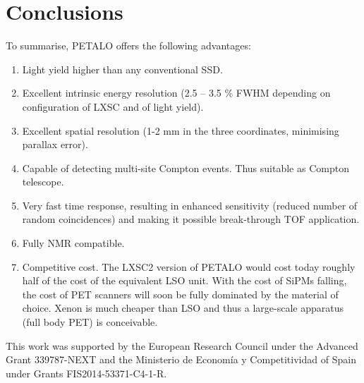 \documentclass{JINST}
\begin{document}

\section{Conclusions}
\label{sec.conclu}

To summarise, PETALO offers the following advantages:
\begin{enumerate}
\item Light yield higher than any conventional SSD.
\item Excellent intrinsic energy resolution (2.5 -- 3.5 \% FWHM depending on configuration of LXSC and of light yield). 
\item Excellent spatial resolution (1-2 mm in the three coordinates, minimising parallax error).
\item Capable of detecting multi-site Compton events. Thus suitable as Compton telescope.
\item Very fast time response, resulting in enhanced sensitivity (reduced number of random coincidences) and making it possible break-through TOF application. 
\item Fully NMR compatible. 
\item Competitive cost. The LXSC2 version of PETALO would cost today roughly half of the cost of the equivalent LSO unit. With the cost of SiPMs falling, the  cost of PET scanners will soon be fully dominated by the material of choice. Xenon is much cheaper than LSO and thus a large-scale apparatus (full body PET) is conceivable. 
\end{enumerate}


\acknowledgments

This work was supported by the European Research Council under the Advanced Grant 339787-NEXT and the Ministerio de Econom\'{i}a y Competitividad of Spain under Grants  FIS2014-53371-C4-1-R.


\end{document}
